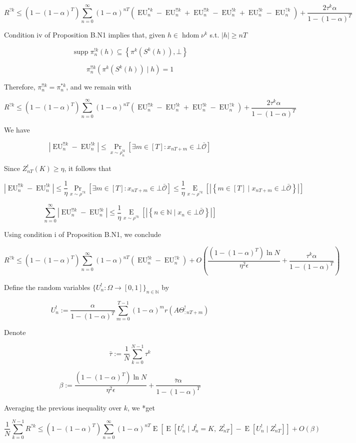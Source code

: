 \documentclass[a4paper]{article}
\DeclareMathOperator{\Supp}{supp}
\newcommand{\AP}[1]{\left(#1\right)}
\newcommand{\AB}[1]{\left[#1\right]}
\newcommand{\AC}[1]{\left\{#1\right\}}
\newcommand{\E}[1]{\underset{#1}{\operatorname{E}}}
\newcommand{\Ea}[2]{\underset{#1}{\operatorname{E}}\AB{#2}}
\newcommand{\Nats}{\mathbb{N}}
\newcommand{\Sq}[2]{\{#1\}_{#2 \in \Nats}}
\newcommand{\Sqn}[1]{\Sq{#1}{n}}
\newcommand{\Abs}[1]{\left\vert #1 \right\vert}
\newcommand{\Ob}{\mathcal{O}}
\newcommand{\Ado}{\bar{\Ob}}
\DeclareMathOperator{\HD}{hdom}
\newcommand{\EU}{\operatorname{EU}}
\newcommand{\Z}{Z}
\newcommand{\J}{J}
\begin{document}
$$R^{?k} \leq\AP{1-(1-\alpha)^T}\sum_{n=0}^\infty (1-\alpha)^{nT} \left(\EU^{*k}_n-\EU^{!!k}_n+\EU^{!!k}_n-\EU^{!k}_n+\EU^{!k}_n-\EU^{?k}_n\right) + \frac{2\tau^k\alpha}{1-(1-\alpha)^T}$$

Condition iv of Proposition B.N1 implies that, given $h \in \HD{\nu^k}$ s.t. $\Abs{h} \geq nT$

$$\Supp{\pi^{!k}_n(h)} \subseteq \AC{\pi^k\AP{S^k(h)},\bot}$$

$$\pi^{!!k}_n\AP{\pi^k\AP{S^k(h)} \mid h} = 1$$

Therefore, $\pi^{!!k}_n = \pi^{*k}_n$, and we remain with

$$R^{?k} \leq\AP{1-(1-\alpha)^T}\sum_{n=0}^\infty (1-\alpha)^{nT} \left(\EU^{!!k}_n-\EU^{!k}_n+\EU^{!k}_n-\EU^{?k}_n\right) + \frac{2\tau^k\alpha}{1-(1-\alpha)^T}$$

We have

$$\Abs{\EU^{!!k}_n-\EU^{!k}_n} \leq \Pr_{x\sim\rho^{!k}_n}\left[\exists m \in [T]: x_{nT+m} \in \bot\Ado\right]$$

Since $\Z_{nT}^{!}(K) \geq \eta$, it follows that

$$\Abs{\EU^{!!k}_n-\EU^{!k}_n} \leq \frac{1}{\eta}\Pr_{x\sim\rho^{?k}}\left[\exists m \in [T]: x_{nT+m} \in \bot\Ado\right] \leq \frac{1}{\eta}\Ea{x\sim\rho^{?k}}{\Abs{\AC{m \in [T] \mid x_{nT+m} \in \bot\Ado}}}$$

$$\sum_{n=0}^\infty \Abs{\EU^{!!k}_n-\EU^{!k}_n} \leq \frac{1}{\eta}\Ea{x\sim\rho^{?k}}{\Abs{\AC{n \in \Nats \mid x_n \in \bot\Ado}}}$$

Using condition i of Proposition B.N1, we conclude

$$R^{?k} \leq\AP{1-(1-\alpha)^T}\sum_{n=0}^\infty (1-\alpha)^{nT} \left(\EU^{!k}_n-\EU^{?k}_n\right) + O\AP{\frac{\AP{1-(1-\alpha)^T}\ln N}{\eta^2\epsilon}+\frac{\tau^k\alpha}{1-(1-\alpha)^T}}$$

Define the random variables $\Sqn{U^!_n : \Omega \rightarrow [0,1]}$ by 

$$U^!_n:=\frac{\alpha}{1-(1-\alpha)^T}\sum_{m=0}^{T-1} (1-\alpha)^{m} r\left(A\Theta^!_{:nT+m}\right)$$

Denote 

$$\bar{\tau} := \frac{1}{N}\sum_{k=0}^{N-1} {\tau^k}$$

$$\beta:=\frac{\AP{1-(1-\alpha)^T}\ln N}{\eta^2\epsilon}+\frac{\bar{\tau}\alpha}{1-(1-\alpha)^T}$$

Averaging the previous inequality over $k$, we *get

$$\frac{1}{N}\sum_{k=0}^{N-1}R^{?k} \leq \AP{1-(1-\alpha)^T}\sum_{n=0}^\infty (1-\alpha)^{nT} \E{}\left[\E{}\left[U^!_n \mid \J^!_n = K,\ Z^!_{nT}\right]-\E{}\left[U^!_n \mid Z^!_{nT}\right]\right] + O\AP{\beta}$$
\end{document}

